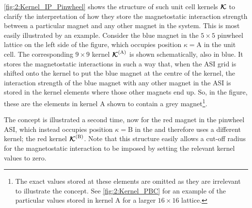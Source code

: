 
\cref{fig:2:Kernel_IP_Pinwheel} shows the structure of such unit cell kernels $\boldsymbol{\mathbf{\mathcal{K}}}$ to clarify the interpretation of how they store the magnetostatic interaction strength between a particular magnet and any other magnet in the system.
This is most easily illustrated by an example.
Consider the blue magnet in the $5 \times 5$ pinwheel lattice on the left side of the figure, which occupies position $\kappa=\mathrm{A}$ in the unit cell.
The corresponding $9 \times 9$ kernel $\boldsymbol{\mathbf{\mathcal{K}}}^\mathrm{(A)}$ is shown schematically, also in blue.
It stores the magnetostatic interactions in such a way that, when the ASI grid is shifted onto the kernel to put the blue magnet at the centre of the kernel, the interaction strength of the blue magnet with any other magnet in the ASI is stored in the kernel elements where those other magnets end up.
So, in the figure, these are the elements in kernel A shown to contain a grey magnet\footnote{
	The exact values stored at these elements are omitted as they are irrelevant to illustrate the concept. See \cref{fig:2:Kernel_PBC} for an example of the particular values stored in kernel A for a larger $16 \times 16$ lattice.
}. \par
The concept is illustrated a second time, now for the red magnet in the pinwheel ASI, which instead occupies position $\kappa=\mathrm{B}$ in the  and therefore uses a different kernel; the red kernel $\boldsymbol{\mathbf{\mathcal{K}}}^\mathrm{(B)}$.
Note that this structure easily allows a cut-off radius for the magnetostatic interaction to be imposed by setting the relevant kernel values to zero. \\\par

